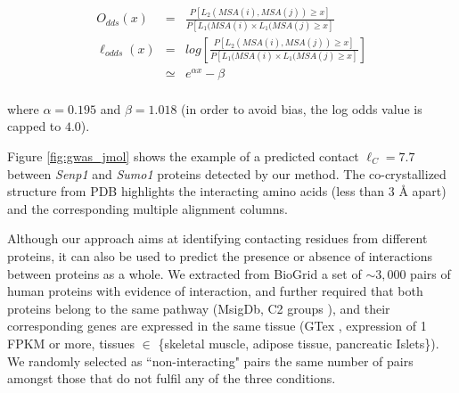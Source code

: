\begin{eqnarray*}
O_{dds}(x) & = & \frac{P[ L_2(MSA(i), MSA(j)) \ge x ]}{P[ L_1(MSA(i) \times L_1(MSA(j) \ge x]} \\
\ell_{odds}(x) & = & log\left[ \frac{P[ L_2(MSA(i), MSA(j)) \ge x ]}{P[ L_1(MSA(i) \times L_1(MSA(j) \ge x]} \right] \\
    & \simeq &e^{\alpha x}- \beta \\
\end{eqnarray*}

\noindent where $\alpha = 0.195$ and $\beta = 1.018$ (in order to avoid bias, the log odds value is capped to $4.0$).


Figure \ref{fig:gwas_jmol} shows the example of a predicted contact $\ell_C = 7.7$ between \textit{Senp1} and \textit{Sumo1} proteins detected by our method. The co-crystallized structure from PDB highlights the interacting amino acids (less than $3$ \r{A} apart) and the corresponding multiple alignment columns.

Although our approach aims at identifying contacting residues from different proteins, it can also be used to predict the presence or absence of interactions between proteins as a whole. We extracted from BioGrid \cite{stark2006biogrid} a set of $\sim3,000$ pairs of human proteins with evidence of interaction, and further required that both proteins belong to the same pathway (MsigDb, C2 groups \cite{subramanian2005gene}), and their corresponding genes are expressed in the same tissue (GTex \cite{lonsdale2013genotype}, expression of 1 FPKM or more, tissues $\in$ \{skeletal muscle, adipose tissue, pancreatic Islets\}). We randomly selected as ``non-interacting" pairs the same number of pairs amongst those that do not fulfil any of the three conditions.


